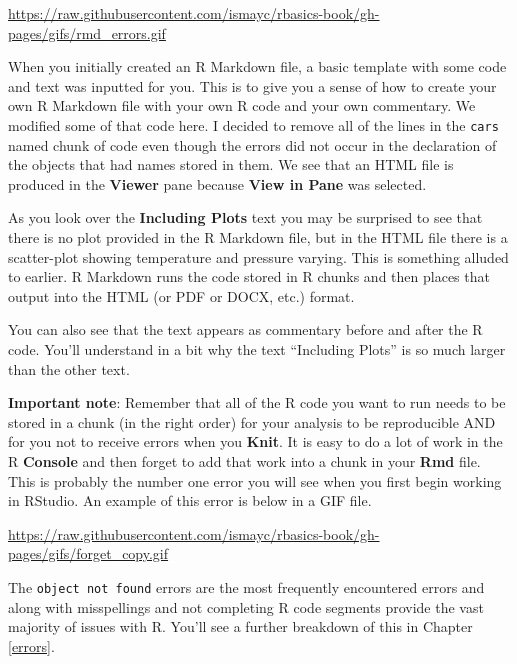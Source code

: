 \documentclass[]{tufte-book}
\begin{document}
\begin{center}\footnotesize{\url{https://raw.githubusercontent.com/ismayc/rbasics-book/gh-pages/gifs/rmd_errors.gif}}\end{center}

\vspace{0.1in}

When you initially created an R Markdown file, a basic template with
some code and text was inputted for you. This is to give you a sense of
how to create your own R Markdown file with your own R code and your own
commentary. We modified some of that code here. I decided to remove all
of the lines in the \texttt{cars} named chunk of code even though the
errors did not occur in the declaration of the objects that had names
stored in them. We see that an HTML file is produced in the
\textbf{Viewer} pane because \textbf{View in Pane} was selected.

As you look over the \textbf{Including Plots} text you may be surprised
to see that there is no plot provided in the R Markdown file, but in the
HTML file there is a scatter-plot showing temperature and pressure
varying. This is something alluded to earlier. R Markdown runs the code
stored in R chunks and then places that output into the HTML (or PDF or
DOCX, etc.) format.

You can also see that the text appears as commentary before and after
the R code. You'll understand in a bit why the text ``Including Plots''
is so much larger than the other text.

\textbf{Important note}: Remember that all of the R code you want to run
needs to be stored in a chunk (in the right order) for your analysis to
be reproducible AND for you not to receive errors when you
\textbf{Knit}. It is easy to do a lot of work in the R \textbf{Console}
and then forget to add that work into a chunk in your \textbf{Rmd} file.
This is probably the number one error you will see when you first begin
working in RStudio. An example of this error is below in a GIF file.

\vspace{0.1in}

\begin{center}\footnotesize{\url{https://raw.githubusercontent.com/ismayc/rbasics-book/gh-pages/gifs/forget_copy.gif}}\end{center}

\vspace{0.1in}

The \texttt{object\ not\ found} errors are the most frequently
encountered errors and along with misspellings and not completing R code
segments provide the vast majority of issues with R. You'll see a
further breakdown of this in Chapter \ref{errors}.
\end{document}
